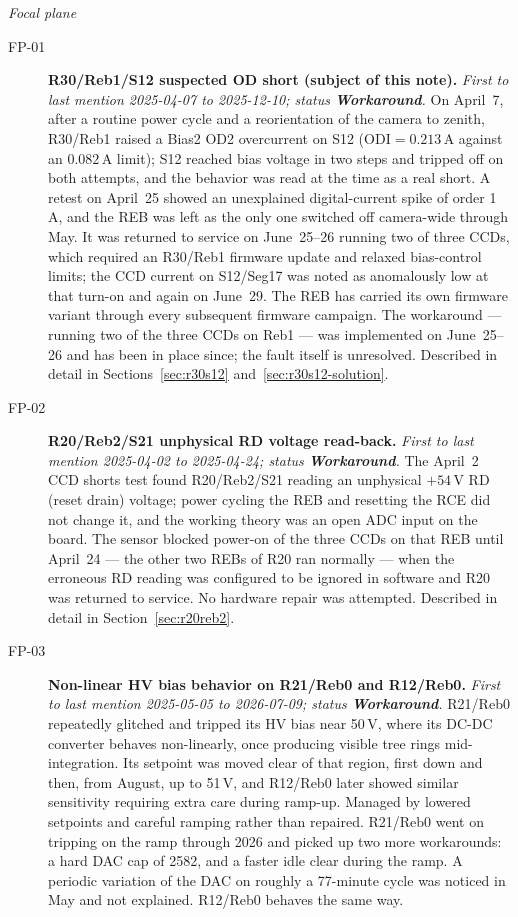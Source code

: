 \noindent\textit{Focal plane}
\begin{description}
\item[FP-01]\label{iss:FP-01} \textbf{R30/Reb1/S12 suspected OD short (subject of this note).}
  \emph{First to last mention 2025-04-07 to 2025-12-10; status \textcolor{stwrk}{\textbf{Workaround}}.}
  On April~7, after a routine power cycle and a reorientation of the camera to zenith, R30/Reb1 raised a Bias2 OD2 overcurrent on S12 ($\mathrm{ODI}=0.213$\,A against an $0.082$\,A limit); S12 reached bias voltage in two steps and tripped off on both attempts, and the behavior was read at the time as a real short.  A retest on April~25 showed an unexplained digital-current spike of order 1\,A, and the REB was left as the only one switched off camera-wide through May.  It was returned to service on June~25--26 running two of three CCDs, which required an R30/Reb1 firmware update and relaxed bias-control limits; the CCD current on S12/Seg17 was noted as anomalously low at that turn-on and again on June~29.  The REB has carried its own firmware variant through every subsequent firmware campaign.  The workaround --- running two of the three CCDs on Reb1 --- was implemented on June~25--26 and has been in place since; the fault itself is unresolved. Described in detail in Sections~\ref{sec:r30s12} and~\ref{sec:r30s12-solution}.

\item[FP-02]\label{iss:FP-02} \textbf{R20/Reb2/S21 unphysical RD voltage read-back.}
  \emph{First to last mention 2025-04-02 to 2025-04-24; status \textcolor{stwrk}{\textbf{Workaround}}.}
  The April~2 CCD shorts test found R20/Reb2/S21 reading an unphysical $+54$\,V RD (reset drain) voltage; power cycling the REB and resetting the RCE did not change it, and the working theory was an open ADC input on the board.  The sensor blocked power-on of the three CCDs on that REB until April~24 --- the other two REBs of R20 ran normally --- when the erroneous RD reading was configured to be ignored in software and R20 was returned to service.  No hardware repair was attempted. Described in detail in Section~\ref{sec:r20reb2}.

\item[FP-03]\label{iss:FP-03} \textbf{Non-linear HV bias behavior on R21/Reb0 and R12/Reb0.}
  \emph{First to last mention 2025-05-05 to 2026-07-09; status \textcolor{stwrk}{\textbf{Workaround}}.}
  R21/Reb0 repeatedly glitched and tripped its HV bias near 50\,V, where its DC-DC converter behaves non-linearly, once producing visible tree rings mid-integration.  Its setpoint was moved clear of that region, first down and then, from August, up to 51\,V, and R12/Reb0 later showed similar sensitivity requiring extra care during ramp-up.  Managed by lowered setpoints and careful ramping rather than repaired.  R21/Reb0 went on tripping on the ramp through 2026 and picked up two more workarounds: a hard DAC cap of 2582, and a faster idle clear during the ramp.  A periodic variation of the DAC on roughly a 77-minute cycle was noticed in May and not explained.  R12/Reb0 behaves the same way.


\end{description}
